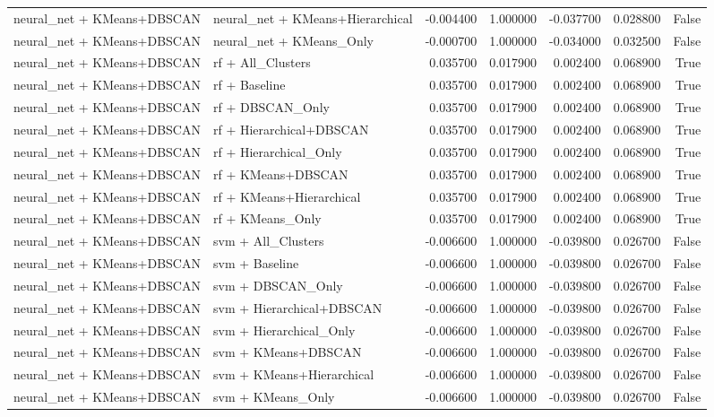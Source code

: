 \begin{tabular}{llrrrrr}
neural_net + KMeans+DBSCAN & neural_net + KMeans+Hierarchical & -0.004400 & 1.000000 & -0.037700 & 0.028800 & False \\
neural_net + KMeans+DBSCAN & neural_net + KMeans_Only & -0.000700 & 1.000000 & -0.034000 & 0.032500 & False \\
neural_net + KMeans+DBSCAN & rf + All_Clusters & 0.035700 & 0.017900 & 0.002400 & 0.068900 & True \\
neural_net + KMeans+DBSCAN & rf + Baseline & 0.035700 & 0.017900 & 0.002400 & 0.068900 & True \\
neural_net + KMeans+DBSCAN & rf + DBSCAN_Only & 0.035700 & 0.017900 & 0.002400 & 0.068900 & True \\
neural_net + KMeans+DBSCAN & rf + Hierarchical+DBSCAN & 0.035700 & 0.017900 & 0.002400 & 0.068900 & True \\
neural_net + KMeans+DBSCAN & rf + Hierarchical_Only & 0.035700 & 0.017900 & 0.002400 & 0.068900 & True \\
neural_net + KMeans+DBSCAN & rf + KMeans+DBSCAN & 0.035700 & 0.017900 & 0.002400 & 0.068900 & True \\
neural_net + KMeans+DBSCAN & rf + KMeans+Hierarchical & 0.035700 & 0.017900 & 0.002400 & 0.068900 & True \\
neural_net + KMeans+DBSCAN & rf + KMeans_Only & 0.035700 & 0.017900 & 0.002400 & 0.068900 & True \\
neural_net + KMeans+DBSCAN & svm + All_Clusters & -0.006600 & 1.000000 & -0.039800 & 0.026700 & False \\
neural_net + KMeans+DBSCAN & svm + Baseline & -0.006600 & 1.000000 & -0.039800 & 0.026700 & False \\
neural_net + KMeans+DBSCAN & svm + DBSCAN_Only & -0.006600 & 1.000000 & -0.039800 & 0.026700 & False \\
neural_net + KMeans+DBSCAN & svm + Hierarchical+DBSCAN & -0.006600 & 1.000000 & -0.039800 & 0.026700 & False \\
neural_net + KMeans+DBSCAN & svm + Hierarchical_Only & -0.006600 & 1.000000 & -0.039800 & 0.026700 & False \\
neural_net + KMeans+DBSCAN & svm + KMeans+DBSCAN & -0.006600 & 1.000000 & -0.039800 & 0.026700 & False \\
neural_net + KMeans+DBSCAN & svm + KMeans+Hierarchical & -0.006600 & 1.000000 & -0.039800 & 0.026700 & False \\
neural_net + KMeans+DBSCAN & svm + KMeans_Only & -0.006600 & 1.000000 & -0.039800 & 0.026700 & False \\

\end{tabular}

